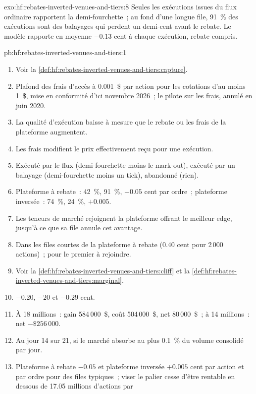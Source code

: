 \begin{solution}{exo:hf:rebates-inverted-venues-and-tiers:8}
Seules les exécutions issues du flux ordinaire rapportent la demi-fourchette~; au fond d'une longue file, 91~\% des exécutions sont des balayages qui perdent un demi-cent avant le rebate. Le
modèle rapporte en moyenne $-0.13$ cent à chaque exécution, rebate compris.
\end{solution}

\begin{solution}{pb:hf:rebates-inverted-venues-and-tiers:1}
\begin{enumerate}
\item Voir la \cref{def:hf:rebates-inverted-venues-and-tiers:capture}.
\item Plafond des frais d'accès à 0.001~\$ par action pour les cotations d'au moins 1~\$, mise en conformité d'ici novembre 2026~; le pilote sur les frais, annulé en juin 2020.
\item La qualité d'exécution baisse à mesure que le rebate ou les frais de la plateforme augmentent.
\item Les frais modifient le prix effectivement reçu pour une exécution.
\item Exécuté par le flux (demi-fourchette moins le mark-out), exécuté par un balayage (demi-fourchette moins un tick), abandonné (rien).
\item Plateforme à rebate~: 42~\%, 91~\%, $-0.05$ cent par ordre~; plateforme inversée~: 74~\%, 24~\%, $+0.005$.
\item Les teneurs de marché rejoignent la plateforme offrant le meilleur edge, jusqu'à ce que sa file annule cet avantage.
\item Dans les files courtes de la plateforme à rebate (0.40 cent pour 2\,000 actions)~; pour le premier à rejoindre.
\item Voir la \cref{def:hf:rebates-inverted-venues-and-tiers:cliff} et la \cref{def:hf:rebates-inverted-venues-and-tiers:marginal}.
\item $-0.20$, $-20$ et $-0.29$ cent.
\item À 18 millions~: gain 584\,000~\$, coût 504\,000~\$, net 80\,000~\$~; à 14 millions~: net $-\$256\,000$.
\item Au jour 14 sur 21, si le marché absorbe au plus 0.1~\% du volume consolidé par jour.
\item Plateforme à rebate $-0.05$ et plateforme inversée $+0.005$ cent par action et par ordre pour des files typiques~; viser le palier cesse d'être rentable en dessous de 17.05 millions d'actions par

\end{enumerate}
\end{solution}

